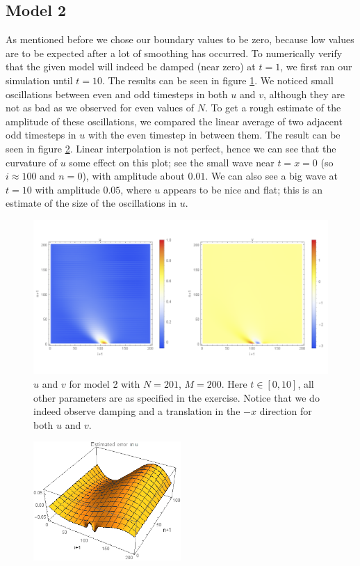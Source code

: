 \documentclass{article}
\renewcommand{\(}{\left(}
\renewcommand{\)}{\right)}
\begin{document}
\subsection*{Model 2}
As mentioned before we chose our boundary values to be zero, because low values are to be expected after a lot of smoothing has occurred. To numerically verify that the given model will indeed be damped (near zero) at $t=1$, we first ran our simulation until $t=10$. The results can be seen in figure \ref{fig:uvdamp}. We noticed small oscillations between even and odd timesteps in both $u$ and $v$, although they are not as bad as we observed for even values of $N$. To get a rough estimate of the amplitude of these oscillations, we compared the linear average of two adjacent odd timesteps in $u$ with the even timestep in between them. The result can be seen in figure \ref{fig:oscsize}. Linear interpolation is not perfect, hence we can see that the curvature of $u$ some effect on this plot; see the small wave near $t=x=0$ (so $i \approx 100$ and $n = 0$), with amplitude about $0.01$. We can also see a big wave at $t=10$ with amplitude $0.05$, where $u$ appears to be nice and flat; this is an estimate of the size of the oscillations in $u$.

\begin{figure}
\centering
\includegraphics[width=1.1\textwidth]{uvdamping.png}
\caption{$u$ and $v$ for model 2 with $N=201$, $M=200$. Here $t\in[0,10]$, all other parameters are as specified in the exercise. Notice that we do indeed observe damping and a translation in the $-x$ direction for both $u$ and $v$.}
\label{fig:uvdamp}
\end{figure}

\begin{figure}
\centering
\includegraphics[width=0.5\textwidth]{oscsize.png}
\caption{}
\label{fig:oscsize}
\end{figure}
\end{document}
